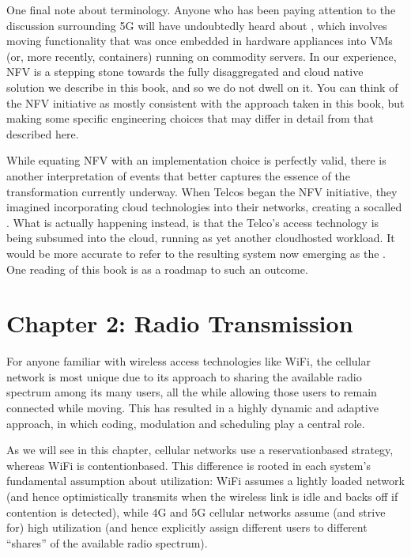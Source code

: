 \documentclass[a4paper,11pt,english]{sphinxmanual}
\begin{document}
\sphinxAtStartPar
One final note about terminology. Anyone who has been paying
attention to the discussion surrounding 5G will have undoubtedly heard
about , which involves moving
functionality that was once embedded in hardware appliances into VMs
(or, more recently, containers)
running on commodity servers. In our experience, NFV is a stepping
stone towards the fully disaggregated and cloud native solution we
describe in this book, and so we do not dwell on it. You can think of
the NFV initiative as mostly consistent with the approach taken in
this book, but making some specific engineering choices that may
differ in detail from that described here.

\sphinxAtStartPar
While equating NFV with an implementation choice is perfectly valid,
there is another interpretation of events that better captures the
essence of the transformation currently underway. When Telcos began
the NFV initiative, they imagined incorporating cloud technologies
into their networks, creating a so\sphinxhyphen{}called .  What is
actually happening instead, is that the Telco’s access technology is
being subsumed into the cloud, running as yet another cloud\sphinxhyphen{}hosted
workload. It would be more accurate to refer to the resulting system
now emerging as the . One reading of this book is
as a roadmap to such an outcome.


\chapter{Chapter 2:  Radio Transmission}
\label{\detokenize{primer:chapter-2-radio-transmission}}\label{\detokenize{primer::doc}}
\sphinxAtStartPar
For anyone familiar with wireless access technologies like Wi\sphinxhyphen{}Fi, the
cellular network is most unique due to its approach to sharing the
available radio spectrum among its many users, all the while allowing
those users to remain connected while moving. This has resulted in a
highly dynamic and adaptive approach, in which coding, modulation and
scheduling play a central role.

\sphinxAtStartPar
As we will see in this chapter, cellular networks use a
reservation\sphinxhyphen{}based strategy, whereas Wi\sphinxhyphen{}Fi is contention\sphinxhyphen{}based. This
difference is rooted in each system’s fundamental assumption about
utilization: Wi\sphinxhyphen{}Fi assumes a lightly loaded network (and hence
optimistically transmits when the wireless link is idle and backs off if
contention is detected), while 4G and 5G cellular networks assume (and
strive for) high utilization (and hence explicitly assign different
users to different “shares” of the available radio spectrum).
\end{document}
